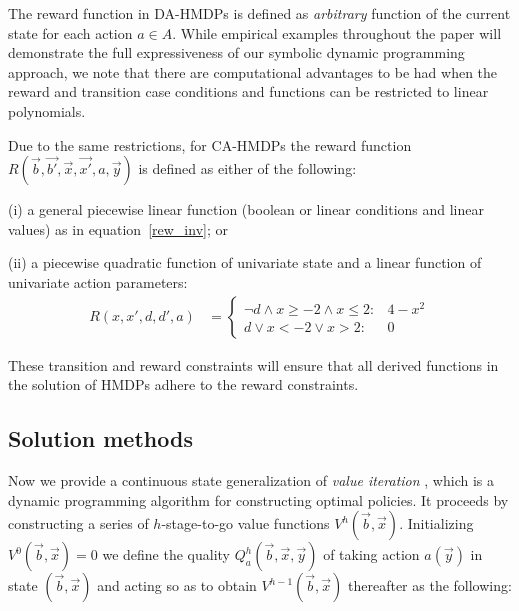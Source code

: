 \documentclass[twoside,11pt]{article}
\begin{document}
The reward function in DA-HMDPs is defined as \emph{arbitrary} function of the current state for each action $a \in A$. 
While  empirical examples throughout the paper will demonstrate the full expressiveness of our symbolic dynamic programming approach, we note that there are computational advantages to be had when the reward and transition case conditions and functions can be restricted to linear polynomials.  

Due to the same restrictions, for CA-HMDPs the reward function $R(\vec{b},\vec{b'},\vec{x},\vec{x'}, a,\vec{y})$ is defined as either of the following:

(i) a general piecewise linear function (boolean or linear conditions and linear values) as in equation~\eqref{rew_inv}; or

(ii) a piecewise quadratic function of univariate state and a linear function of univariate action parameters:
\begin{align}
R(x,x',d,d', a) & = \begin{cases}
\neg d \land x \geq -2 \land x \leq 2 : & 4 - x^2 \\
d \lor x < -2 \lor x > 2 : & 0
\end{cases} \nonumber 
\end{align}

These transition and reward constraints will ensure that all derived functions in the solution of HMDPs adhere to the reward 
constraints.

\subsection{Solution methods}
\label{sec:soln}
Now we provide a continuous state generalization of {\it value
iteration} \cite{bellman}, which is a dynamic programming algorithm
for constructing optimal policies.  It proceeds by constructing a
series of $h$-stage-to-go value functions $V^h(\vec{b},\vec{x})$.
Initializing $V^0(\vec{b},\vec{x}) = 0$ we define the quality
$Q_a^{h}(\vec{b},\vec{x},\vec{y})$ of taking action $a(\vec{y})$ in state
$(\vec{b},\vec{x})$ and acting so as to obtain
$V^{h-1}(\vec{b},\vec{x})$ thereafter as the following:
\end{document}
